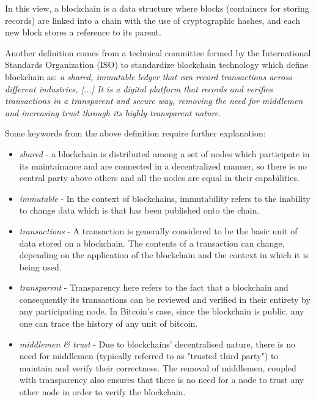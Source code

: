 In this view, a blockchain is a data structure where blocks (containers for storing records) are linked into a chain with the use of cryptographic hashes, and each new block stores a reference to its parent. 

Another definition comes from a technical committee formed by the International Standards Organization (ISO) to standardize blockchain technology \cite{isotc307} which define blockchain as:
\textit{
    a shared, immutable ledger that can record transactions across different industries, [...] 
    It is a digital platform that records and verifies transactions in a transparent and secure way, removing the need for middlemen and increasing trust through its highly transparent nature.
} 

Some keywords from the above definition require further explanation: 

\begin{itemize}
    \item \textit{shared} - a blockchain is distributed among a set of nodes which participate in its maintainance and are connected in a decentralized manner, so  there is no central party above others and all the nodes are equal in their capabilities.

    \item \textit{immutable} - In the context of blockchains, immutability refers to the inability to change data which is that has been published onto the chain.

    \item \textit{transactions}  - A transaction is generally considered to be the basic unit of data stored on a blockchain. The contents of a transaction can change, depending on the application of the blockchain and the context in which it is being used.

    \item \textit{transparent} - Transparency here refers to the fact that a blockchain and consequently its transactions can be reviewed and verified in their entirety by any participating node. 
    In Bitcoin's case, since the blockchain is public, any one can trace the history of any unit of bitcoin.

    \item \textit{middlemen \& trust} - Due to blockchains' decentralised nature, there is no need for middlemen (typically referred to as "trusted third party") to maintain and verify their correctness. 
    The removal of middlemen, coupled with transparency also ensures that there is no need for a node to trust any other node in order to verify the blockchain.
    
\end{itemize}

